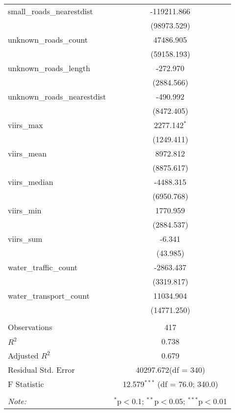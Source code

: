 \begin{table}[!htbp]
\begin{tabular}{@{\extracolsep{5pt}}lc}
 small_roads_nearestdist & -119211.866$^{}$ \\
  & (98973.529) \\
 unknown_roads_count & 47486.905$^{}$ \\
  & (59158.193) \\
 unknown_roads_length & -272.970$^{}$ \\
  & (2884.566) \\
 unknown_roads_nearestdist & -490.992$^{}$ \\
  & (8472.405) \\
 viirs_max & 2277.142$^{*}$ \\
  & (1249.411) \\
 viirs_mean & 8972.812$^{}$ \\
  & (8875.617) \\
 viirs_median & -4488.315$^{}$ \\
  & (6950.768) \\
 viirs_min & 1770.959$^{}$ \\
  & (2884.537) \\
 viirs_sum & -6.341$^{}$ \\
  & (43.985) \\
 water_traffic_count & -2863.437$^{}$ \\
  & (3319.817) \\
 water_transport_count & 11034.904$^{}$ \\
  & (14771.250) \\
\hline \\[-1.8ex]
 Observations & 417 \\
 $R^2$ & 0.738 \\
 Adjusted $R^2$ & 0.679 \\
 Residual Std. Error & 40297.672(df = 340)  \\
 F Statistic & 12.579$^{***}$ (df = 76.0; 340.0) \\
\hline
\hline \\[-1.8ex]
\textit{Note:} & \multicolumn{1}{r}{$^{*}$p$<$0.1; $^{**}$p$<$0.05; $^{***}$p$<$0.01} \\
\end{tabular}
\end{table}